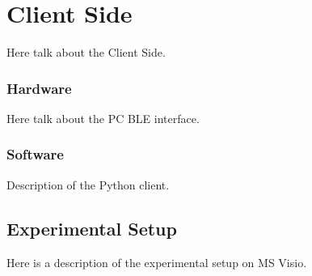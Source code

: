 \section{Client Side}
\par
Here talk about the Client Side.

\subsubsection{Hardware}
\par
Here talk about the PC BLE interface. 

\subsubsection{Software}
\par
Description of the Python client.

\subsection{Experimental Setup}
\par
Here is a description of the experimental setup on MS Visio.
